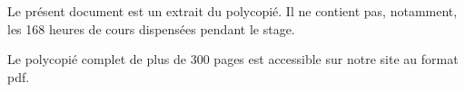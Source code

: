 










\LARGE  

Le présent document est un extrait du polycopié. Il ne contient pas, notamment, les 168 heures de cours dispensées pendant le stage.

\bigskip

Le polycopié complet de plus de 300 pages est accessible sur notre site au format pdf.

\newpage